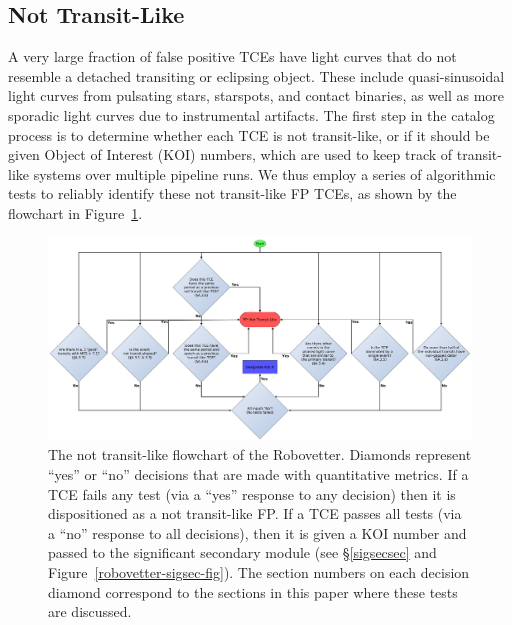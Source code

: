 \subsection{Not Transit-Like}
\label{nottransitlikesec}

A very large fraction of false positive TCEs have light curves that do not resemble a detached transiting or eclipsing object. These include quasi-sinusoidal light curves from pulsating stars, starspots, and contact binaries, as well as more sporadic light curves due to instrumental artifacts. The first step in the catalog process is to determine whether each TCE is not transit-like, or if it should be given \kepler{} Object of Interest (KOI) numbers, which are used to keep track of transit-like systems over multiple \kepler{} pipeline runs. We thus employ a series of algorithmic tests to reliably identify these not transit-like FP TCEs, as shown by the flowchart in Figure~\ref{robovetter-transitlike-fig}.


\begin{figure}[ht]
\centering
\includegraphics[width=\linewidth]{RoboVetter-Diagram-V4-TransitLike.pdf}
\caption{The not transit-like flowchart of the Robovetter. Diamonds represent ``yes'' or ``no'' decisions that are made with quantitative metrics. If a TCE fails any test (via a ``yes'' response to any decision) then it is dispositioned as a not transit-like FP. If a TCE passes all tests (via a ``no'' response to all decisions), then it is given a KOI number and passed to the significant secondary module (see \S\ref{sigsecsec} and Figure~\ref{robovetter-sigsec-fig}). The section numbers on each decision diamond correspond to the sections in this paper where these tests are discussed.}
\label{robovetter-transitlike-fig}
\end{figure}



